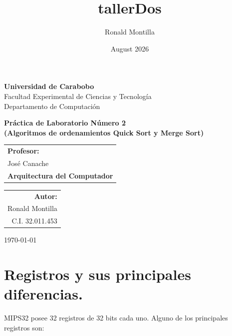 \documentclass[12pt, a4paper]{article}
\title{tallerDos}
\author{Ronald Montilla}
\date{August 2026}
\begin{document}
    \begin{titlepage}
        \centering %
    
        {\bfseries\LARGE Universidad de Carabobo} \\[0.4cm]
        {\LARGE Facultad Experimental de Ciencias y Tecnología} \\[0.2cm]
        {\LARGE Departamento de Computación} \\[1.5cm]
        
    
        
        \vfill
    
        {\bfseries\Huge Práctica de Laboratorio Número 2} \\
        {\bfseries(Algoritmos de ordenamientos Quick Sort y Merge Sort)}\\[0.5cm]
        
        \vfill
        
        \vfill
        \begin{tabular}[t]{l}
            \large\textbf{Profesor:} \\
            \large José Canache \\
            \large\textbf{Arquitectura del Computador}
        \end{tabular}
        \hfill
        \begin{tabular}[t]{r}
            \large\textbf{Autor:} \\
            \large Ronald Montilla \\
            \large C.I. 32.011.453
        \end{tabular}
    
        {\today}
        
    \end{titlepage}
    \newpage
    \tableofcontents
    \newpage
    \section{Registros y sus principales diferencias.}
    MIPS32 posee 32 registros de 32 bits cada uno. Alguno de los principales registros son:
\end{document}
